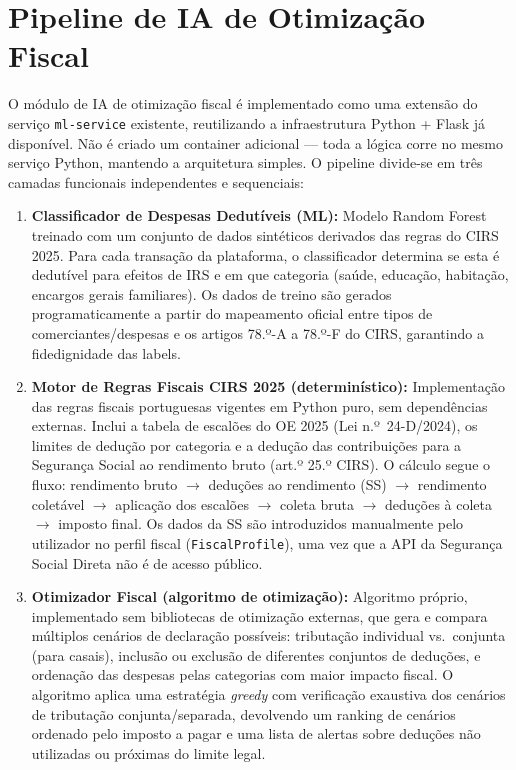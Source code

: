 

\section{Pipeline de IA de Otimização Fiscal}
\label{sec:arq-fiscal-ia}

O módulo de \ac{IA} de otimização fiscal é implementado como uma extensão do serviço \texttt{ml-service} existente, reutilizando a infraestrutura Python + Flask já disponível. Não é criado um container adicional --- toda a lógica corre no mesmo serviço Python, mantendo a arquitetura simples. O pipeline divide-se em três camadas funcionais independentes e sequenciais:

\begin{enumerate}
    \item \textbf{Classificador de Despesas Dedutíveis (ML):} Modelo Random Forest treinado com um conjunto de dados sintéticos derivados das regras do \ac{CIRS} 2025. Para cada transação da plataforma, o classificador determina se esta é dedutível para efeitos de \ac{IRS} e em que categoria (saúde, educação, habitação, encargos gerais familiares). Os dados de treino são gerados programaticamente a partir do mapeamento oficial entre tipos de comerciantes/despesas e os artigos 78.º-A a 78.º-F do \ac{CIRS}, garantindo a fidedignidade das labels.

    \item \textbf{Motor de Regras Fiscais CIRS 2025 (determinístico):} Implementação das regras fiscais portuguesas vigentes em Python puro, sem dependências externas. Inclui a tabela de escalões do \ac{OE} 2025 (Lei n.º~24-D/2024), os limites de dedução por categoria e a dedução das contribuições para a Segurança Social ao rendimento bruto (art.º 25.º \ac{CIRS}). O cálculo segue o fluxo: rendimento bruto $\rightarrow$ deduções ao rendimento (SS) $\rightarrow$ rendimento coletável $\rightarrow$ aplicação dos escalões $\rightarrow$ coleta bruta $\rightarrow$ deduções à coleta $\rightarrow$ imposto final. Os dados da \ac{SS} são introduzidos manualmente pelo utilizador no perfil fiscal (\texttt{FiscalProfile}), uma vez que a \ac{API} da Segurança Social Direta não é de acesso público.

    \item \textbf{Otimizador Fiscal (algoritmo de otimização):} Algoritmo próprio, implementado sem bibliotecas de otimização externas, que gera e compara múltiplos cenários de declaração possíveis: tributação individual vs.\ conjunta (para casais), inclusão ou exclusão de diferentes conjuntos de deduções, e ordenação das despesas pelas categorias com maior impacto fiscal. O algoritmo aplica uma estratégia \textit{greedy} com verificação exaustiva dos cenários de tributação conjunta/separada, devolvendo um ranking de cenários ordenado pelo imposto a pagar e uma lista de alertas sobre deduções não utilizadas ou próximas do limite legal.
\end{enumerate}

